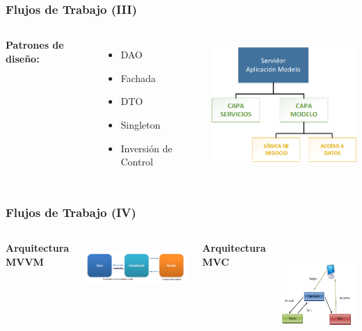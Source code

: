 \documentclass[usenames,dvipsnames]{beamer}
\begin{document}
\begin{frame}
\frametitle{Flujos de Trabajo (III)}

\begin{columns}[c] %

\textbf{Patrones de diseño:}
\begin{itemize}
	\item DAO
	\item Fachada
	\item DTO
	\item Singleton
	\item Inversión de Control
\end{itemize}

\includegraphics[height=5cm]{./img/arqmodelo.png}

\end{columns}
\end{frame}


\begin{frame}
\frametitle{Flujos de Trabajo (IV)}

\begin{columns}[c] %

\centering
\textbf{Arquitectura MVVM}

\vspace{1.4cm}
\includegraphics[height=2cm]{./img/MVVM.png}


\vspace{0.5cm}
\centering
\textbf{Arquitectura MVC}


\includegraphics[height=4cm]{./img/MVC.png}



\end{columns}
\end{frame}
\end{document}

